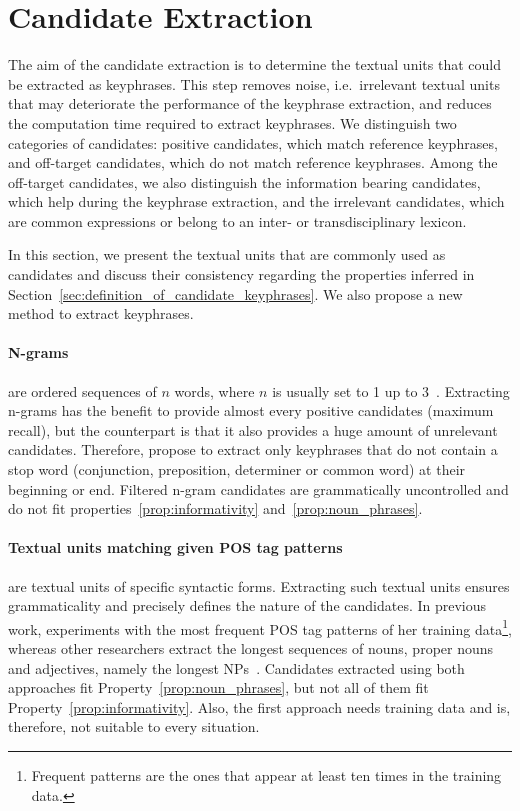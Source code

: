 \section{Candidate Extraction}
\label{sec:candidate_extraction}
  The aim of the candidate extraction is to determine the textual units that
  could be extracted as keyphrases. This step removes noise, i.e.~irrelevant
  textual units that may deteriorate the performance of the keyphrase
  extraction, and reduces the computation time required to extract  keyphrases.
  We distinguish two categories of candidates: positive candidates, which match
  reference keyphrases, and off-target candidates, which do not match reference
  keyphrases. Among the off-target candidates, we also distinguish the
  information bearing candidates, which help during the keyphrase extraction,
  and the irrelevant candidates, which are common expressions or belong to an
  inter- or transdisciplinary lexicon.

  In this section, we present the textual units that are commonly used as
  candidates and discuss their consistency regarding the properties inferred in
  Section~\ref{sec:definition_of_candidate_keyphrases}. We also propose a new
  method to extract keyphrases.

  \paragraph{N-grams} are ordered sequences of $n$ words, where $n$ is usually
  set to 1 up to 3~\cite{witten1999kea}. Extracting n-grams has the benefit to
  provide almost every positive candidates (maximum recall), but the
  counterpart is that it also provides a huge amount of unrelevant candidates.
  Therefore,  propose to extract only keyphrases that do
  not contain a stop word (conjunction, preposition, determiner or common word)
  at their beginning or end. Filtered n-gram candidates are grammatically
  uncontrolled and do not fit properties~\ref{prop:informativity}
  and~\ref{prop:noun_phrases}.

  \paragraph{Textual units matching given POS tag patterns} are textual units of
  specific syntactic forms. Extracting such textual units ensures grammaticality
  and precisely defines the nature of the candidates. In previous work,
   experiments with the most frequent POS
  tag patterns of her training data\footnote{Frequent patterns are the ones that
  appear at least ten times in the training data.}, whereas other researchers
  extract the longest sequences of nouns, proper nouns and adjectives, namely
  the longest NPs~\cite{hassan2010conundrums}. Candidates extracted using both
  approaches fit Property~\ref{prop:noun_phrases}, but not all of them fit
  Property~\ref{prop:informativity}. Also, the first approach needs training
  data and is, therefore, not suitable to every situation.

